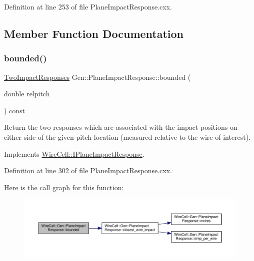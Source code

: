 Definition at line 253 of file Plane\+Impact\+Response.\+cxx.



\subsection{Member Function Documentation}
\mbox{\label{class_wire_cell_1_1_gen_1_1_plane_impact_response_aa33dc4d2ab03046b055a8a8843fc07bd}} 
\subsubsection{\texorpdfstring{bounded()}{bounded()}}
{\footnotesize\ttfamily \hyperlink{namespace_wire_cell_ae163f7e69ff1625cf269418b35194d37}{Two\+Impact\+Responses} Gen\+::\+Plane\+Impact\+Response\+::bounded (\begin{DoxyParamCaption}\item[{double}]{relpitch }\end{DoxyParamCaption}) const\hspace{0.3cm}{\ttfamily [virtual]}}

Return the two responses which are associated with the impact positions on either side of the given pitch location (measured relative to the wire of interest). 

Implements \hyperlink{class_wire_cell_1_1_i_plane_impact_response_af336a51ac8ccc5df822e10fe1d8275d3}{Wire\+Cell\+::\+I\+Plane\+Impact\+Response}.



Definition at line 302 of file Plane\+Impact\+Response.\+cxx.

Here is the call graph for this function\+:
\nopagebreak
\begin{figure}[H]
\begin{center}
\leavevmode
\includegraphics[width=350pt]{class_wire_cell_1_1_gen_1_1_plane_impact_response_aa33dc4d2ab03046b055a8a8843fc07bd_cgraph}
\end{center}
\end{figure}
\mbox{\label{class_wire_cell_1_1_gen_1_1_plane_impact_response_aae6cf57460996098bba052af6793a6de}} 

